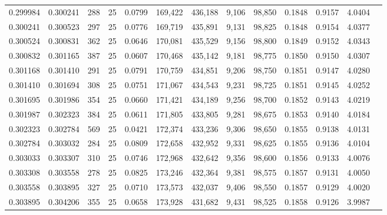 \begin{tabular}{rrrrrrrrrrrrr}
0.299984 & 0.300241 &   288 &  25 &                                     0.0799 & 169,422 & 436,188 &   9,106 &  98,850 & 0.1848 & 0.9157 & 4.0404 \\
0.300241 & 0.300523 &   297 &  25 &                                     0.0776 & 169,719 & 435,891 &   9,131 &  98,825 & 0.1848 & 0.9154 & 4.0377 \\
0.300524 & 0.300831 &   362 &  25 &                                     0.0646 & 170,081 & 435,529 &   9,156 &  98,800 & 0.1849 & 0.9152 & 4.0343 \\
0.300832 & 0.301165 &   387 &  25 &                                     0.0607 & 170,468 & 435,142 &   9,181 &  98,775 & 0.1850 & 0.9150 & 4.0307 \\
0.301168 & 0.301410 &   291 &  25 &                                     0.0791 & 170,759 & 434,851 &   9,206 &  98,750 & 0.1851 & 0.9147 & 4.0280 \\
0.301410 & 0.301694 &   308 &  25 &                                     0.0751 & 171,067 & 434,543 &   9,231 &  98,725 & 0.1851 & 0.9145 & 4.0252 \\
0.301695 & 0.301986 &   354 &  25 &                                     0.0660 & 171,421 & 434,189 &   9,256 &  98,700 & 0.1852 & 0.9143 & 4.0219 \\
0.301987 & 0.302323 &   384 &  25 &                                     0.0611 & 171,805 & 433,805 &   9,281 &  98,675 & 0.1853 & 0.9140 & 4.0184 \\
0.302323 & 0.302784 &   569 &  25 &                                     0.0421 & 172,374 & 433,236 &   9,306 &  98,650 & 0.1855 & 0.9138 & 4.0131 \\
0.302784 & 0.303032 &   284 &  25 &                                     0.0809 & 172,658 & 432,952 &   9,331 &  98,625 & 0.1855 & 0.9136 & 4.0104 \\
0.303033 & 0.303307 &   310 &  25 &                                     0.0746 & 172,968 & 432,642 &   9,356 &  98,600 & 0.1856 & 0.9133 & 4.0076 \\
0.303308 & 0.303558 &   278 &  25 &                                     0.0825 & 173,246 & 432,364 &   9,381 &  98,575 & 0.1857 & 0.9131 & 4.0050 \\
0.303558 & 0.303895 &   327 &  25 &                                     0.0710 & 173,573 & 432,037 &   9,406 &  98,550 & 0.1857 & 0.9129 & 4.0020 \\
0.303895 & 0.304206 &   355 &  25 &                                     0.0658 & 173,928 & 431,682 &   9,431 &  98,525 & 0.1858 & 0.9126 & 3.9987 \\

\end{tabular}
